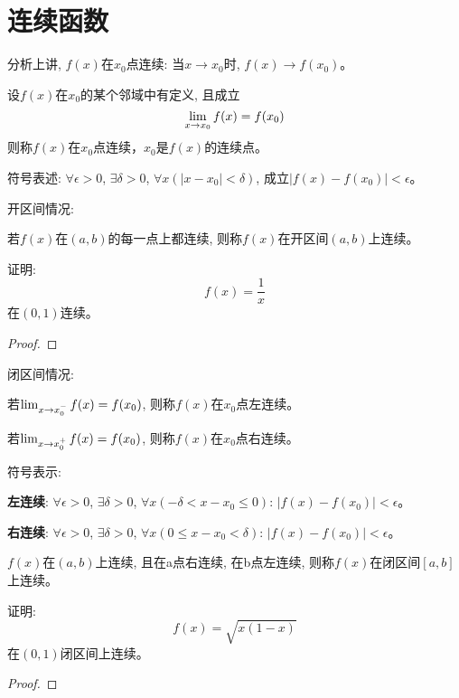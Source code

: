 \section{连续函数}
分析上讲, $f(x)$在$x_0$点连续: 当$x \to x_0$时, $f(x) \to f(x_0)$。
\begin{definition}
    设$f(x)$在$x_0$的某个邻域中有定义, 且成立
    \[ \lim_{x \to x_0 } f(x) = f(x_0) \]
    则称$f(x)$在$x_0$点连续，$x_0$是$f(x)$的连续点。

    符号表述:
    $\forall \epsilon > 0$, $\exists \delta > 0$, $\forall x(\left| x - x_0 \right| < \delta)$, 成立$\left| f(x) - f(x_0) \right| < \epsilon$。
\end{definition}

开区间情况:
\begin{definition}
    若$f(x)$在$(a, b)$的每一点上都连续, 则称$f(x)$在开区间$(a, b)$上连续。
\end{definition}
\begin{proposition}
    证明:
    \[ f(x) = \frac{1}{x}\]
    在$(0, 1)$连续。
\end{proposition}
\begin{proof}
    
\end{proof}

闭区间情况:
\begin{definition}
    若$\lim_{x \to x_0^- } f(x) = f(x_0)$, 则称$f(x)$在$x_0$点左连续。

    若$\lim_{x \to x_0^+ } f(x) = f(x_0)$, 则称$f(x)$在$x_0$点右连续。

    符号表示:

    {\bf 左连续}: $\forall \epsilon > 0$, $\exists \delta > 0$, $\forall x(-\delta < x-x_0 \le 0)$: $\left| f(x) - f(x_0)\right| < \epsilon$。

    {\bf 右连续}: $\forall \epsilon > 0$, $\exists \delta > 0$, $\forall x(0 \le x-x_0 < \delta)$: $\left| f(x) - f(x_0)\right| < \epsilon$。   
\end{definition}

\begin{definition}
    $f(x)$在$(a, b)$上连续, 且在a点右连续, 在b点左连续, 则称$f(x)$在闭区间$[a, b]$上连续。
\end{definition}
\begin{proposition}
    证明:
    \[ f(x) = \sqrt{x(1-x)}\]
    在$(0, 1)$闭区间上连续。
\end{proposition}
\begin{proof}
    
\end{proof}

